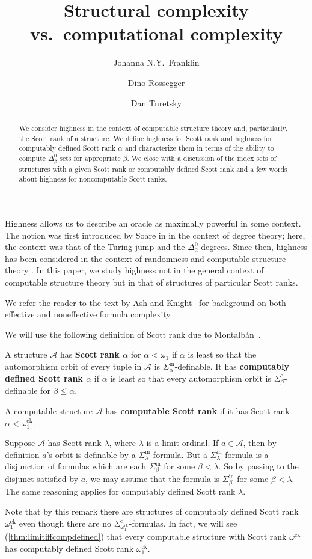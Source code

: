 \documentclass{amsart}
\title{Structural complexity vs.\ computational complexity}
\author{Johanna N.Y.\ Franklin}
\author{Dino Rossegger}
\author{Dan Turetsky}
\newcommand\+[1]{\mathcal{#1}}
\renewcommand\*[1]{\mathbf{#1}}
\renewcommand\=[1]{\text{#1}}
\renewcommand\*[1]{\mathbf{#1}}
\newcommand{\A}{\mathcal{A}}
\newcommand{\Sinf}[1]{\Sigma^{\mathrm{in}}_{#1}}
\newcommand{\Sicom}[1]{\Sigma^{\mathrm{c}}_{#1}}
\newcommand{\ock}{\omega_{1}^{\mathrm{ck}}}
\newcommand{\define}[1]{\textbf{#1}}
\begin{document}
 

\begin{abstract}
We consider highness in the context of computable structure theory and, particularly, the Scott rank of a structure. We define highness for Scott rank and highness for computably defined Scott rank $\alpha$ and characterize them in terms of the ability to compute $\Delta^0_\beta$ sets for appropriate $\beta$. We close with a discussion of the index sets of structures with a given Scott rank or computably defined Scott rank and a few words about highness for noncomputable Scott ranks.
\end{abstract}

\maketitle 

Highness allows us to describe an oracle as maximally powerful in some context. The notion was first introduced by Soare in \cite{s72} in the context of degree theory; here, the context was that of the Turing jump and the $\Delta^0_2$ degrees. Since then, highness has been considered in the context of randomness \cite{fsy-bases} and computable structure theory \cite{cft23,cft}. In this paper, we study highness not in the general context of computable structure theory but in that of structures of particular Scott ranks.

We refer the reader to the text by Ash and Knight~\cite{ash2000} for background on both effective and noneffective formula complexity.

We will use the following definition of Scott rank due to Montalbán~\cite{montalban2015a}.
\begin{definition}
  A structure $\A$ has \define{Scott rank $\alpha$} for $\alpha<\omega_1$ if $\alpha$ is least so that the automorphism orbit of every tuple in $\A$ is $\Sinf{\alpha}$-definable.
  It has \define{computably defined Scott rank $\alpha$} if $\alpha$ is least so that every automorphism orbit is $\Sicom\beta$-definable for $\beta\leq \alpha$.
\end{definition}
A computable structure $\A$ has \define{computable Scott rank} if it has Scott rank $\alpha<\ock$. 
\begin{remark}
Suppose $\A$ has Scott rank $\lambda$, where $\lambda$ is a limit ordinal. If $\bar a \in \A$, then by definition $\bar a$'s orbit is definable by a $\Sinf{\lambda}$ formula.  But a $\Sinf{\lambda}$ formula is a disjunction of formulas which are each $\Sinf{\beta}$ for some $\beta < \lambda$.  So by passing to the disjunct satisfied by $\bar a$, we may assume that the formula is $\Sinf{\beta}$ for some $\beta < \lambda$.
The same reasoning applies for computably defined Scott rank $\lambda$.
\end{remark}
Note that by this remark there are structures of computably defined Scott rank $\ock$ even though there are no $\Sicom\ock$-formulas. In fact, we will see (\cref{thm:limitiffcompdefined}) that every computable structure with Scott rank $\ock$ has computably defined Scott rank $\ock$.
\end{document}
